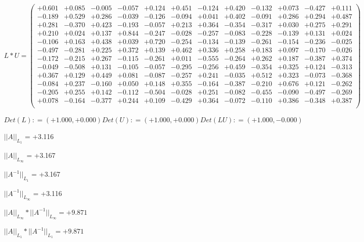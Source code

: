 \documentclass[9pt]{article}
\theoremstyle{plain}
\theoremstyle{definition}
\theoremstyle{remark}
\numberwithin{equation}{section}
\begin{document}
$L * U  = \left(
\begin{array}{
cccccccccccc}
+0.601 & +0.085 & -0.005 & -0.057 & +0.124 & +0.451 & -0.124 & +0.420 & -0.132 & +0.073 & -0.427 & +0.111 \\
-0.189 & +0.529 & +0.286 & -0.039 & -0.126 & -0.094 & +0.041 & +0.402 & -0.091 & +0.286 & +0.294 & +0.487 \\
+0.281 & -0.370 & +0.423 & -0.193 & -0.057 & +0.213 & +0.364 & -0.354 & -0.317 & +0.030 & +0.275 & +0.291 \\
+0.210 & +0.024 & +0.137 & +0.844 & -0.247 & -0.028 & -0.257 & -0.083 & -0.228 & -0.139 & +0.131 & +0.024 \\
-0.106 & +0.163 & +0.438 & +0.039 & +0.720 & -0.254 & -0.134 & -0.139 & -0.261 & -0.154 & -0.236 & -0.025 \\
-0.497 & -0.281 & +0.225 & +0.372 & +0.139 & +0.462 & +0.336 & +0.258 & +0.183 & +0.097 & -0.170 & -0.026 \\
-0.172 & -0.215 & +0.267 & -0.115 & -0.261 & +0.011 & -0.555 & -0.264 & +0.262 & +0.187 & -0.387 & +0.374 \\
-0.049 & -0.508 & +0.131 & -0.105 & -0.057 & -0.295 & -0.256 & +0.459 & -0.354 & +0.325 & +0.124 & -0.313 \\
+0.367 & +0.129 & +0.449 & +0.081 & -0.087 & -0.257 & +0.241 & -0.035 & +0.512 & +0.323 & -0.073 & -0.368 \\
-0.084 & +0.237 & -0.160 & +0.050 & +0.148 & +0.355 & -0.164 & -0.387 & -0.210 & +0.676 & +0.121 & -0.262 \\
-0.205 & +0.255 & +0.142 & -0.112 & -0.504 & -0.028 & +0.251 & -0.082 & -0.455 & -0.090 & -0.497 & -0.269 \\
+0.078 & -0.164 & -0.377 & +0.244 & +0.109 & -0.429 & +0.364 & -0.072 & -0.110 & +0.386 & -0.348 & +0.387 \\
\end{array}
\right)$ \newline 

$Det(L) :    = (+1.000,+0.000)     Det(U) :    = (+1.000,+0.000)     Det(LU) :    = (+1.000,-0.000)$

$||A||_{L_1}$  = +3.116

$||A||_{L_{\infty}}$ = +3.167

$||A^{-1}||_{L_1}$  = +3.167

$||A^{-1}||_{L_{\infty}}$ = +3.116

$||A||_{L_{\infty}} * ||A^{-1}||_{L_{\infty}} = +9.871$

$||A||_{L_1} * ||A^{-1}||_{L_1} = +9.871$
\end{document}
